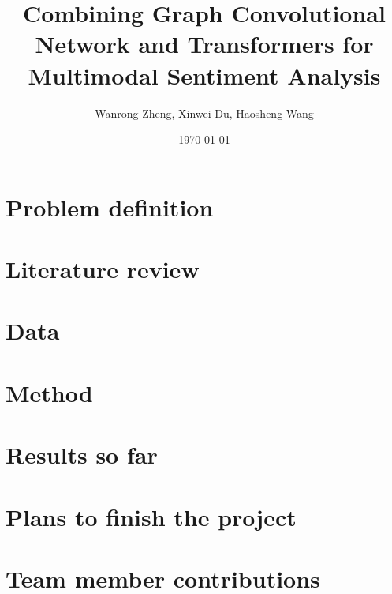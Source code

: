 \documentclass[11pt]{article}
\title{Combining Graph Convolutional Network and Transformers for Multimodal Sentiment Analysis}
\author{
  Wanrong Zheng,
  Xinwei Du,
  Haosheng Wang
  }
\date{\today}
\begin{document}
\maketitle

\section{Problem definition}

\section{Literature review}

\section{Data}

\section{Method}

\section{Results so far}

\section{Plans to finish the project}

\cite{zadeh2018multimodal}
\section{Team member contributions}




\end{document}
